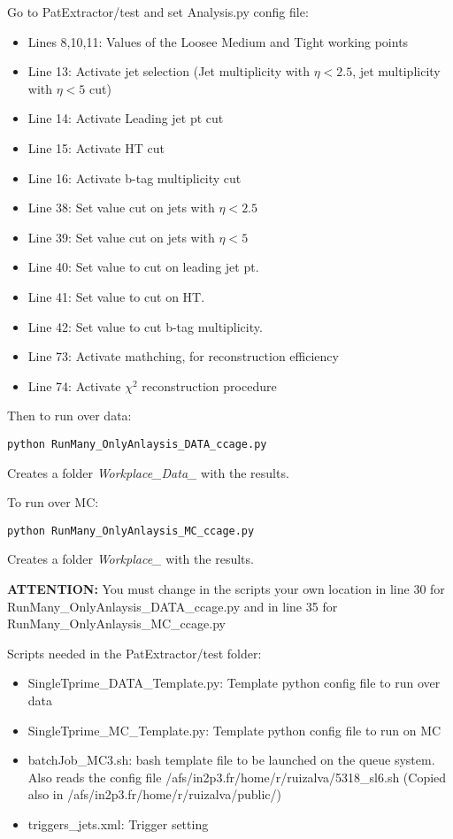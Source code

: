 \documentclass[11pt,a4paper]{article}
\begin{document}
Go to PatExtractor/test and set Analysis.py config file:
\begin{itemize}
\item Lines 8,10,11: Values of the Loosee Medium and Tight working points
\item Line 13: Activate jet selection (Jet multiplicity with $\eta<2.5$, jet multiplicity with $\eta<5$ cut)
\item Line 14: Activate Leading jet pt cut
\item Line 15: Activate HT cut
\item Line 16: Activate b-tag multiplicity cut
\item Line 38: Set value cut on jets with $\eta<2.5$
\item Line 39: Set value cut on jets with $\eta<5$
\item Line 40: Set value to cut on leading jet pt.
\item Line 41: Set value to cut on HT.
\item Line 42: Set value to cut b-tag multiplicity.
\item Line 73: Activate mathching, for reconstruction efficiency
\item Line 74: Activate $\chi^{2}$ reconstruction procedure
\end{itemize}

Then to run over data:
\begin{verbatim}
python RunMany_OnlyAnlaysis_DATA_ccage.py
\end{verbatim}
Creates a folder \textit{Workplace\_Data\_\*} with the results.

To run over MC:
\begin{verbatim}
python RunMany_OnlyAnlaysis_MC_ccage.py
\end{verbatim}
Creates a folder \textit{Workplace\_\*} with the results.

\textbf{ATTENTION:} You must change in the scripts your own location in line 30 for RunMany\_OnlyAnlaysis\_DATA\_ccage.py and in line 35 for RunMany\_OnlyAnlaysis\_MC\_ccage.py

Scripts needed in the PatExtractor/test folder:
\begin{itemize}
\item SingleTprime\_DATA\_Template.py: Template python config file to run over data
\item SingleTprime\_MC\_Template.py: Template python config file to run on MC
\item batchJob\_MC3.sh: bash template file to be launched on the queue system. Also reads the config file /afs/in2p3.fr/home/r/ruizalva/5318\_sl6.sh (Copied also in /afs/in2p3.fr/home/r/ruizalva/public/)
\item triggers\_jets.xml: Trigger setting
\end{itemize}
\end{document}
